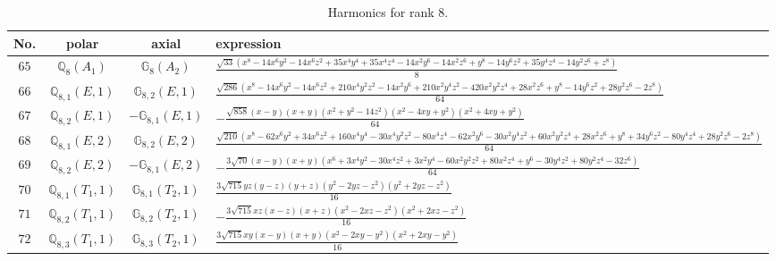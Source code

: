 \documentclass[fleqn,8pt,landscape]{jsarticle}
\begin{document}
\begin{table}[ht!]
\begin{center}
\caption{Harmonics for rank 8.}
\renewcommand{\arraystretch}{1.3}
\begin{tabular}{cccl} \hline \hline
No. & polar & axial & expression \\ \hline
$ 65 $ & $ \mathbb{Q}_{8}(A_{1}) $ & $ \mathbb{G}_{8}(A_{2}) $ & $ \frac{\sqrt{33} \left(x^{8} - 14 x^{6} y^{2} - 14 x^{6} z^{2} + 35 x^{4} y^{4} + 35 x^{4} z^{4} - 14 x^{2} y^{6} - 14 x^{2} z^{6} + y^{8} - 14 y^{6} z^{2} + 35 y^{4} z^{4} - 14 y^{2} z^{6} + z^{8}\right)}{8} $ \\
$ 66 $ & $ \mathbb{Q}_{8,1}(E,1) $ & $ \mathbb{G}_{8,2}(E,1) $ & $ \frac{\sqrt{286} \left(x^{8} - 14 x^{6} y^{2} - 14 x^{6} z^{2} + 210 x^{4} y^{2} z^{2} - 14 x^{2} y^{6} + 210 x^{2} y^{4} z^{2} - 420 x^{2} y^{2} z^{4} + 28 x^{2} z^{6} + y^{8} - 14 y^{6} z^{2} + 28 y^{2} z^{6} - 2 z^{8}\right)}{64} $ \\
$ 67 $ & $ \mathbb{Q}_{8,2}(E,1) $ & $ -\mathbb{G}_{8,1}(E,1) $ & $ - \frac{\sqrt{858} \left(x - y\right) \left(x + y\right) \left(x^{2} + y^{2} - 14 z^{2}\right) \left(x^{2} - 4 x y + y^{2}\right) \left(x^{2} + 4 x y + y^{2}\right)}{64} $ \\
$ 68 $ & $ \mathbb{Q}_{8,1}(E,2) $ & $ \mathbb{G}_{8,2}(E,2) $ & $ \frac{\sqrt{210} \left(x^{8} - 62 x^{6} y^{2} + 34 x^{6} z^{2} + 160 x^{4} y^{4} - 30 x^{4} y^{2} z^{2} - 80 x^{4} z^{4} - 62 x^{2} y^{6} - 30 x^{2} y^{4} z^{2} + 60 x^{2} y^{2} z^{4} + 28 x^{2} z^{6} + y^{8} + 34 y^{6} z^{2} - 80 y^{4} z^{4} + 28 y^{2} z^{6} - 2 z^{8}\right)}{64} $ \\
$ 69 $ & $ \mathbb{Q}_{8,2}(E,2) $ & $ -\mathbb{G}_{8,1}(E,2) $ & $ - \frac{3 \sqrt{70} \left(x - y\right) \left(x + y\right) \left(x^{6} + 3 x^{4} y^{2} - 30 x^{4} z^{2} + 3 x^{2} y^{4} - 60 x^{2} y^{2} z^{2} + 80 x^{2} z^{4} + y^{6} - 30 y^{4} z^{2} + 80 y^{2} z^{4} - 32 z^{6}\right)}{64} $ \\
$ 70 $ & $ \mathbb{Q}_{8,1}(T_{1},1) $ & $ \mathbb{G}_{8,1}(T_{2},1) $ & $ \frac{3 \sqrt{715} y z \left(y - z\right) \left(y + z\right) \left(y^{2} - 2 y z - z^{2}\right) \left(y^{2} + 2 y z - z^{2}\right)}{16} $ \\
$ 71 $ & $ \mathbb{Q}_{8,2}(T_{1},1) $ & $ \mathbb{G}_{8,2}(T_{2},1) $ & $ - \frac{3 \sqrt{715} x z \left(x - z\right) \left(x + z\right) \left(x^{2} - 2 x z - z^{2}\right) \left(x^{2} + 2 x z - z^{2}\right)}{16} $ \\
$ 72 $ & $ \mathbb{Q}_{8,3}(T_{1},1) $ & $ \mathbb{G}_{8,3}(T_{2},1) $ & $ \frac{3 \sqrt{715} x y \left(x - y\right) \left(x + y\right) \left(x^{2} - 2 x y - y^{2}\right) \left(x^{2} + 2 x y - y^{2}\right)}{16} $ \\

\end{tabular}
\end{center}
\end{table}
\end{document}
